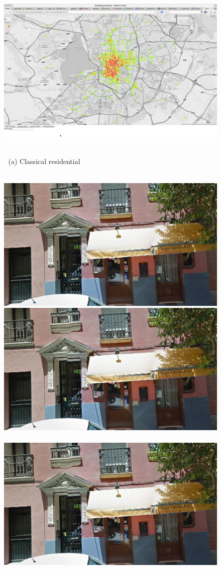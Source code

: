 \documentclass[runningheads, table]{llncs}
\begin{document}
\begin{figure}
\begin{minipage}{\linewidth}
\begin{minipage}{0.3\linewidth}
    \end{minipage}
    \begin{minipage}{0.7\linewidth}
      \includegraphics[trim= 350 150 250 150, clip=true, width=\linewidth]{imgs/arch/mapS2.jpg}
    \end{minipage}
  \end{minipage}
  \\
  $\;$ \hspace{30mm} (a) Classical residential
  \\
  \\
  \begin{minipage}{\linewidth}
    \begin{minipage}{0.3\linewidth}
      \includegraphics[width=0.49\linewidth]{imgs/cutout_pitch04.jpg}
      \includegraphics[width=0.49\linewidth]{imgs/cutout_pitch04.jpg}
      \\ \vspace{-3mm} \\
      \includegraphics[width=0.49\linewidth]{imgs/cutout_pitch04.jpg}

\end{minipage}
\end{minipage}
\end{figure}
\end{document}
